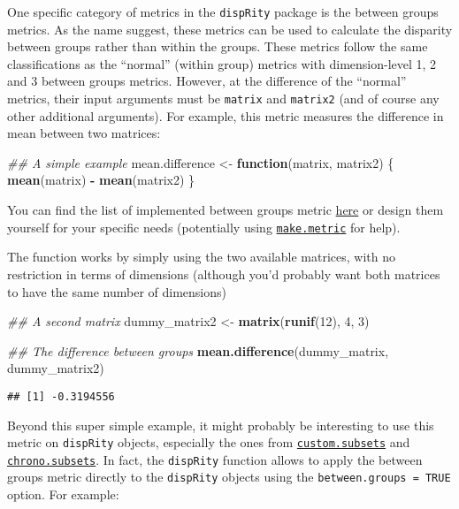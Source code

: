 \documentclass[
]{book}
\newenvironment{Shaded}{\begin{snugshade}}{\end{snugshade}}
\newcommand{\CommentTok}[1]{\textcolor[rgb]{0.56,0.35,0.01}{\textit{#1}}}
\newcommand{\ControlFlowTok}[1]{\textcolor[rgb]{0.13,0.29,0.53}{\textbf{#1}}}
\newcommand{\DecValTok}[1]{\textcolor[rgb]{0.00,0.00,0.81}{#1}}
\newcommand{\KeywordTok}[1]{\textcolor[rgb]{0.13,0.29,0.53}{\textbf{#1}}}
\newcommand{\NormalTok}[1]{#1}
\newcommand{\OperatorTok}[1]{\textcolor[rgb]{0.81,0.36,0.00}{\textbf{#1}}}
\newcommand{\StringTok}[1]{\textcolor[rgb]{0.31,0.60,0.02}{#1}}
\begin{document}
One specific category of metrics in the \texttt{dispRity} package is the between groups metrics.
As the name suggest, these metrics can be used to calculate the disparity between groups rather than within the groups.
These metrics follow the same classifications as the ``normal'' (within group) metrics with dimension-level 1, 2 and 3 between groups metrics.
However, at the difference of the ``normal'' metrics, their input arguments must be \texttt{matrix} and \texttt{matrix2} (and of course any other additional arguments).
For example, this metric measures the difference in mean between two matrices:

\begin{Shaded}
\begin{Highlighting}[]
\CommentTok{\#\# A simple example}
\NormalTok{mean.difference \textless{}{-}}\StringTok{ }\ControlFlowTok{function}\NormalTok{(matrix, matrix2) \{}
  \KeywordTok{mean}\NormalTok{(matrix) }\OperatorTok{{-}}\StringTok{ }\KeywordTok{mean}\NormalTok{(matrix2)}
\NormalTok{\}}
\end{Highlighting}
\end{Shaded}

You can find the list of implemented between groups metric \protect\hyperlink{betweengroupmetricslist}{here} or design them yourself for your specific needs (potentially using \protect\hyperlink{makemetric}{\texttt{make.metric}} for help).

The function works by simply using the two available matrices, with no restriction in terms of dimensions (although you'd probably want both matrices to have the same number of dimensions)

\begin{Shaded}
\begin{Highlighting}[]
\CommentTok{\#\# A second matrix}
\NormalTok{dummy\_matrix2 \textless{}{-}}\StringTok{ }\KeywordTok{matrix}\NormalTok{(}\KeywordTok{runif}\NormalTok{(}\DecValTok{12}\NormalTok{), }\DecValTok{4}\NormalTok{, }\DecValTok{3}\NormalTok{)}

\CommentTok{\#\# The difference between groups}
\KeywordTok{mean.difference}\NormalTok{(dummy\_matrix, dummy\_matrix2)}
\end{Highlighting}
\end{Shaded}

\begin{verbatim}
## [1] -0.3194556
\end{verbatim}

Beyond this super simple example, it might probably be interesting to use this metric on \texttt{dispRity} objects, especially the ones from \protect\hyperlink{custom-subsets}{\texttt{custom.subsets}} and \protect\hyperlink{chrono-subsets}{\texttt{chrono.subsets}}.
In fact, the \texttt{dispRity} function allows to apply the between groups metric directly to the \texttt{dispRity} objects using the \texttt{between.groups\ =\ TRUE} option.
For example:
\end{document}
